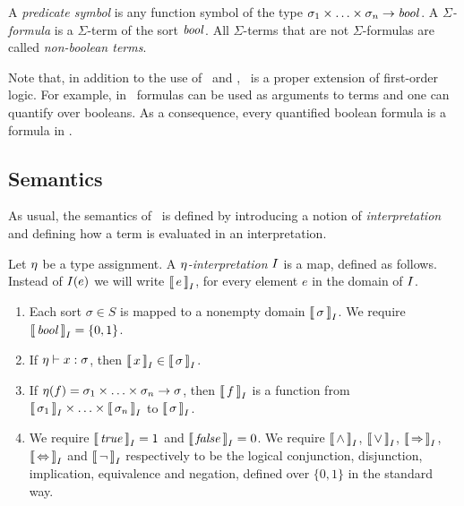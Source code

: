 \begin{definition}
  A \emph{predicate symbol} is any function symbol of the type $\sigma_1 \times \ldots \times \sigma_n \to \mathit{bool}$.
  A \emph{$\Sigma$-formula} is a $\Sigma$-term of the sort $\mathit{bool}$. All $\Sigma$-terms that are not $\Sigma$-formulas are called \emph{non-boolean terms}. \QED
\end{definition}

Note that, in addition to the use of \LETIN\ and \ITE, \folb\ is a proper extension of first-order logic. For example, in \folb\ formulas can be used as arguments to terms and one can quantify over booleans. As a consequence, every quantified boolean formula is a formula in \folb.

\subsection{Semantics}

As usual, the semantics of \folb\ is defined by introducing a notion of \emph{interpretation} and defining how a term is evaluated in an interpretation.

\begin{definition}\label{def:folb-interpretation}
  Let $\eta$ be a type assignment.
  A \emph{$\eta$-interpretation} $I$ is a map, defined as follows. Instead of $I(e)$ we will write $\left\llbracket\,{e}\,\right\rrbracket_{I}$, for every element $e$ in the domain of $I$.
  \begin{enumerate}
    \item Each sort $\sigma \in S$ is mapped to a nonempty domain $\left\llbracket\,{\sigma}\,\right\rrbracket_{I}$. We require $\left\llbracket\,{\mathit{bool}}\,\right\rrbracket_{I} = \left\{0, 1\right\}$.

    \item If $\eta \vdash x:\sigma$, then $\left\llbracket\,{x}\,\right\rrbracket_{I} \in \left\llbracket\,{\sigma}\,\right\rrbracket_{I}$.

    \item If $\eta(f) = \sigma_1 \times \ldots \times \sigma_n \to \sigma$, then $\left\llbracket\,{f}\,\right\rrbracket_{I}$ is a function from $\left\llbracket\,{\sigma_1}\,\right\rrbracket_{I} \times \ldots \times \left\llbracket\,{\sigma_n}\,\right\rrbracket_{I}$ to $\left\llbracket\,{\sigma}\,\right\rrbracket_{I}$.

    \item We require $\left\llbracket\,{\mathit{true}}\,\right\rrbracket_{I} = 1$ and $\left\llbracket\,{\mathit{false}}\,\right\rrbracket_{I} = 0$. We require $\left\llbracket\,{\wedge}\,\right\rrbracket_{I}$, $\left\llbracket\,{\vee}\,\right\rrbracket_{I}$, $\left\llbracket\,{\Rightarrow}\,\right\rrbracket_{I}$, $\left\llbracket\,{\Leftrightarrow}\,\right\rrbracket_{I}$ and $\left\llbracket\,{\neg}\,\right\rrbracket_{I}$ respectively to be the logical conjunction, disjunction, implication, equivalence and negation, defined over $\{0,1\}$ in the standard way. \QED
  \end{enumerate}
\end{definition}

